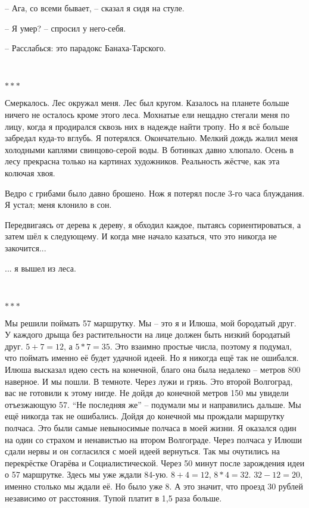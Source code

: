 -- Ага, со всеми бывает, -- сказал я сидя на стуле.

-- Я умер? -- спросил у него-себя.

-- Расслабься: это парадокс Банаха-Тарского.

\
\begin{center}\( *** \)\end{center}
Смеркалось. Лес окружал меня. Лес был кругом. Казалось на планете больше ничего не осталось кроме этого леса. Мохнатые ели нещадно стегали меня по лицу, когда я продирался сквозь них в надежде найти тропу. Но я всё больше забредал куда-то вглубь. Я потерялся. Окончательно. Мелкий дождь жалил меня холодными каплями свинцово-серой воды. В ботинках давно хлюпало. Осень в лесу прекрасна только на картинах художников. Реальность жёстче, как эта колючая хвоя.

Ведро с грибами было давно брошено. Нож я потерял после 3-го часа блуждания. Я устал; меня клонило в сон.

Передвигаясь от дерева к дереву, я обходил каждое, пытаясь сориентироваться, а затем шёл к следующему. И когда мне начало казаться, что это никогда не закочится...

... я вышел из леса.

\
\begin{center}\( *** \)\end{center}
Мы решили поймать 57 маршрутку. Мы -- это я и Илюша, мой бородатый друг. У каждого дрыща без растительности на лице должен быть низкий бородатый друг. \( 5+7=12 \), а \( 5*7=35 \). Это взаимно простые числа, поэтому я подумал, что поймать именно её будет удачной идеей. Но я никогда ещё так не ошибался. Илюша высказал идею сесть на конечной, благо она была недалеко -- метров 800 наверное. И мы пошли. В темноте. Через лужи и грязь. Это второй Волгоград, вас не готовили к этому нигде. Не дойдя до конечной метров 150 мы увидели отъезжающую 57. ``Не последняя же'' -- подумали мы и направились дальше. Мы ещё никогда так не ошибались. Дойдя до конечной мы прождали маршрутку полчаса. Это были самые невыносимые полчаса в моей жизни. Я оказался один на один со страхом и ненавистью на втором Волгограде. Через полчаса у Илюши сдали нервы и он согласился с моей идеей вернуться. Так мы очутились на перекрёстке Огарёва и Социалистической. Через 50 минут после зарождения идеи о 57 маршрутке. Здесь мы уже ждали 84-ую. \( 8 + 4 = 12 \), \( 8 * 4 = 32 \). \( 32 - 12 = 20 \), именно столько мы ждали её. Но было уже 8. А это значит, что проезд 30 рублей независимо от расстояния. Тупой платит в 1,5 раза больше.

